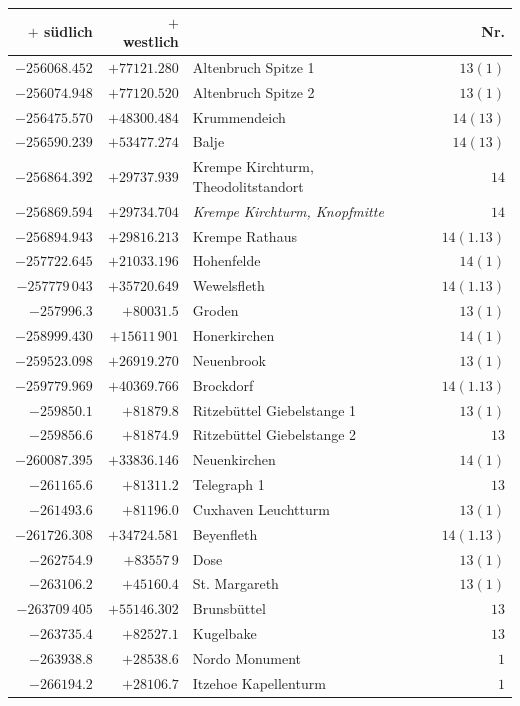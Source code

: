 \clearpage{}%
\begin{center}\begingroup\fontsize{8}{9}\selectfont
\setlength{\tabcolsep}{4pt}
\begin{tabular}{r|r|p{170pt}|r}\hline
\(+\) südlich&\(+\) westlich&&Nr.\\\hline
\(-256068.452\)&\(+77121.280\)&Altenbruch Spitze 1&\(13(1)\)\\
\(-256074.948\)&\(+77120.520\)&Altenbruch Spitze 2&\(13(1)\)\\
\(-256475.570\)&\(+48300.484\)&Krummendeich&\(14(13)\)\\
\(-256590.239\)&\(+53477.274\)&Balje&\(14(13)\)\\
\(-256864.392\)&\(+29737.939\)&Krempe Kirchturm, Theodolitstandort&\(14\)\\
\(-256869.594\)&\(+29734.704\)&\textit{Krempe Kirchturm, Knopfmitte}&\(14\)\\
\(-256894.943\)&\(+29816.213\)&Krempe Rathaus&\(14(1.13)\)\\
\(-257722.645\)&\(+21033.196\)&Hohenfelde&\(14(1)\)\\
\(-257779\,043\)&\(+35720.649\)&Wewelsfleth&\(14(1.13)\)\\
\(-257996.3\)&\(+80031.5\)&Groden&\(13(1)\)\\
\(-258999.430\)&\(+15611\,901\)&Honerkirchen&\(14(1)\)\\
\(-259523.098\)&\(+26919.270\)&Neuenbrook&\(13(1)\)\\
\(-259779.969\)&\(+40369.766\)&Brockdorf&\(14(1.13)\)\\
\(-259850.1\)&\(+81879.8\)&Ritzebüttel Giebelstange 1&\(13(1)\)\\
\(-259856.6\)&\(+81874.9\)&Ritzebüttel Giebelstange 2&\(13\)\\
\(-260087.395\)&\(+33836.146\)&Neuenkirchen&\(14(1)\)\\
\(-261165.6\)&\(+81311.2\)&Telegraph 1&\(13\)\\
\(-261493.6\)&\(+81196.0\)&Cuxhaven Leuchtturm&\(13(1)\)\\
\(-261726.308\)&\(+34724.581\)&Beyenfleth&\(14(1.13)\)\\
\(-262754.9\)&\(+83557\,9\)&Dose&\(13(1)\)\\
\(-263106.2\)&\(+45160.4\)&St. Margareth&\(13(1)\)\\
\(-263709\,405\)&\(+55146.302\)&Brunsbüttel&\(13\)\\
\(-263735.4\)&\(+82527.1\)&Kugelbake&\(13\)\\
\(-263938.8\)&\(+28538.6\)&Nordo Monument&\(1\)\\
\(-266194.2\)&\(+28106.7\)&Itzehoe Kapellenturm&\(1\)\\
\hline\end{tabular}\endgroup\end{center}
